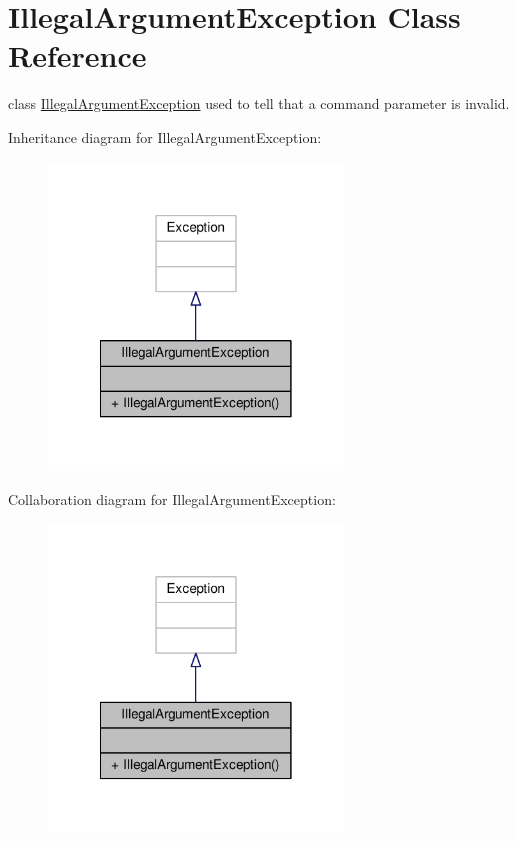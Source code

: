 \hypertarget{classIllegalArgumentException}{\section{Illegal\-Argument\-Exception Class Reference}
\label{classIllegalArgumentException}
}


class \hyperlink{classIllegalArgumentException}{Illegal\-Argument\-Exception} used to tell that a command parameter is invalid.  




Inheritance diagram for Illegal\-Argument\-Exception\-:
\nopagebreak
\begin{figure}[H]
\begin{center}
\leavevmode
\includegraphics[width=222pt]{classIllegalArgumentException__inherit__graph}
\end{center}
\end{figure}


Collaboration diagram for Illegal\-Argument\-Exception\-:
\nopagebreak
\begin{figure}[H]
\begin{center}
\leavevmode
\includegraphics[width=222pt]{classIllegalArgumentException__coll__graph}
\end{center}
\end{figure}
